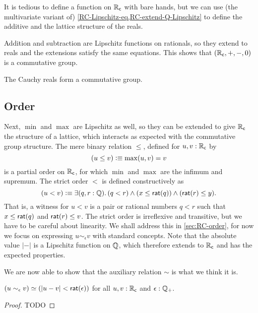 It is tedious to define a function on $\mathbb{R}_\mathsf{c}$ with bare hands, but we can use (the
multivariate variant of) \autoref{RC-Lipschitz-eq,RC-extend-Q-Lipschitz} to define the
additive and the lattice structure of the reals.

Addition and subtraction are Lipschitz functions on rationals, so they extend to reals and
the extensions satisfy the same equations. This shows that $(\mathbb{R}_\mathsf{c}, {+}, {-}, 0)$ is a
commutative group.

\begin{thm} \label{RC-commutative-group}
  The Cauchy reals form a commutative group.
\end{thm}

\subsection{Order}
\label{sec:order}

Next, $\min$ and $\max$ are Lipschitz as well, so they can be extended to give $\mathbb{R}_\mathsf{c}$ the
structure of a lattice, which interacts as expected with the commutative group structure.
The mere binary relation $\leq$, defined for $u, v : \mathbb{R}_\mathsf{c}$ by
%
\begin{equation*}
  (u \leq v) \vcentcolon\equiv \max(u,v) = v
\end{equation*}
%
is a partial order on $\mathbb{R}_\mathsf{c}$, for which $\min$ and $\max$ are the infimum and supremum. The
strict order $<$ is defined constructively as
%
\begin{equation*}
  (u < v) \defeq
  \exis{q, r : \Q} (q < r) \land (x \leq \rcrat(q)) \land (\rcrat(r) \leq y).
\end{equation*}
%
That is, a witness for $u < v$ is a pair or rational numbers $q < r$ such that $x \leq
\mathsf{rat}(q)$ and $\mathsf{rat}(r) \leq v$. The strict order is irreflexive and transitive, but we
have to be careful about linearity. We shall address this in \autoref{sec:RC-order}, for
now we focus on expressing $u \sim_\epsilon v$ with standard concepts. Note that the
absolute value $|{-}|$ is a Lipschitz function on $\mathbb{Q}$, which therefore extends to $\mathbb{R}_\mathsf{c}$
and has the expected properties.

We are now able to show that the auxiliary relation $\sim$ is what we think it is.

\begin{thm} \label{RC-sim-eqv-le}
  $(u \sim_\epsilon v) \simeq (|u - v| < \mathsf{rat}(\epsilon))$
  for all $u, v : \mathbb{R}_\mathsf{c}$ and $\epsilon : \mathbb{Q}_{+}$.
\end{thm}

\begin{proof}
  TODO
\end{proof}

